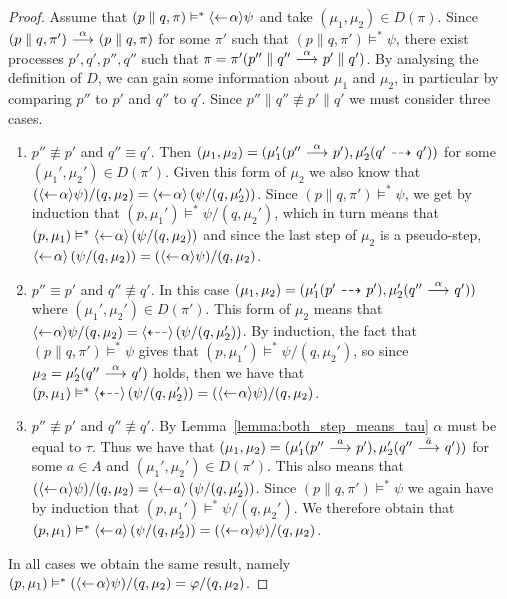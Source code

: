 \begin{proof}
    \par\nobreak
    \ltr Assume that $(p\parallel q, \pi) \vDash^* \mbox{\ensuremath{\langle\leftarrow\! \alpha \rangle}}\psi$ and take
    $(\mu_1,\mu_2)\in D(\pi)$. Since \mbox{$(p\parallel q, \pi') \ {\stackrel{{\alpha}}{\longrightarrow}}\  (p\parallel
    q, \pi)$} for some $\pi'$ such that $(p\parallel q,\pi') \vDash^* \psi$,
    there exist processes $p',q',p'',q''$ such that $\pi
    = \pi'(p''\parallel q'' \ {\stackrel{{\alpha}}{\longrightarrow}}\  p'\parallel q')$. By analysing the definition
    of $D$, we can gain some information about $\mu_1$ and $\mu_2$, in particular by
    comparing $p''$ to $p'$ and $q''$ to $q'$. Since $p''\parallel q'' \not\equiv
    p'\parallel q'$ we must consider three cases.
    \begin{enumerate}
        \item $p''\not\equiv p'$ and $q''\equiv q'$. Then $(\mu_1,\mu_2) = (\mu_1'
            (p'' \ {\stackrel{{\alpha}}{\longrightarrow}}\  p'), \mu_2'(q' \ {\stackrel{_{}}{\dashrightarrow}}\  q'))$ for some $(\mu_1',\mu_2')
            \in D(\pi')$. Given this form of $\mu_2$ we also know that $(\mbox{\ensuremath{\langle\leftarrow\! \alpha \rangle}}
            \psi) / (q,\mu_2) = \mbox{\ensuremath{\langle\leftarrow\! \alpha \rangle}} \left( \psi / (q,\mu_2') \right)$. Since
            $(p\parallel q, \pi') \vDash^* \psi$, we get by induction that $(p,\mu_1')
            \vDash^* \psi / (q,\mu_2')$, which in turn means that $(p,\mu_1)\vDash^*
            \mbox{\ensuremath{\langle\leftarrow\! \alpha \rangle}} \left(\psi / (q,\mu_2)\right)$ and since the last step of
            $\mu_2$ is a pseudo-step, $\mbox{\ensuremath{\langle\leftarrow\! \alpha \rangle}} \left(\psi / (q,\mu_2)\right)
            = (\mbox{\ensuremath{\langle\leftarrow\! \alpha \rangle}}\psi)/(q,\mu_2)$.
        \item $p''\equiv p'$ and $q''\not\equiv q'$. In this case $(\mu_1,\mu_2)
            = (\mu_1'(p'\ {\stackrel{_{}}{\dashrightarrow}}\ p'), \mu_2'(q''\ {\stackrel{{\alpha}}{\longrightarrow}}\ q'))$ where $(\mu_1',
            \mu_2') \in D(\pi')$. This form of $\mu_2$ means that $\mbox{\ensuremath{\langle\leftarrow\! \alpha \rangle}}
            \psi / (q,\mu_2) = \mbox{\ensuremath{\langle\stackrel{_{}}{\dashleftarrow}\rangle}} \left( \psi / (q,\mu_2') \right)$.
            By induction, the fact that $(p\parallel q, \pi') \vDash^* \psi$ gives
            that $(p,\mu_1') \vDash^* \psi / (q,\mu_2')$, so
            since $\mu_2 = \mu_2'(q'' \ {\stackrel{{\alpha}}{\longrightarrow}}\  q')$ holds, then we have that
            $(p,\mu_1) \vDash^*
            \mbox{\ensuremath{\langle\stackrel{_{}}{\dashleftarrow}\rangle}} \left( \psi / (q,\mu_2') \right) = (\mbox{\ensuremath{\langle\leftarrow\! \alpha \rangle}}\psi)
            / (q,\mu_2)$.
        \item $p''\not\equiv p'$ and $q''\not\equiv q'$. By Lemma~\ref{lemma:both_step_means_tau}
            $\alpha$ must be equal to $\tau$. Thus we have that $(\mu_1,\mu_2) =
            (\mu_1'(p''\ {\stackrel{{a}}{\longrightarrow}}\ p'), \mu_2'(q''\ {\stackrel{{\bar a}}{\longrightarrow}}\ q'))$ for some $a\in A$ and
            $(\mu_1',\mu_2') \in D(\pi')$. This also means that $(\mbox{\ensuremath{\langle\leftarrow\! \alpha \rangle}}\psi)
            / (q,\mu_2) = \mbox{\ensuremath{\langle\leftarrow\! a \rangle}}\left( \psi / (q,\mu_2') \right)$. Since $(p\parallel q,
            \pi') \vDash^* \psi$ we again have by induction that $(p,\mu_1')\vDash^*\psi/(q,
            \mu_2')$. We therefore obtain that $(p,\mu_1) \vDash^* \mbox{\ensuremath{\langle\leftarrow\! a \rangle}}\left(
            \psi / (q,\mu_2') \right) = (\mbox{\ensuremath{\langle\leftarrow\! \alpha \rangle}}\psi) / (q,\mu_2)$.
    \end{enumerate}
    In all cases we obtain the same result, namely $(p,\mu_1) \vDash^* (\mbox{\ensuremath{\langle\leftarrow\! \alpha \rangle}}\psi)
    / (q,\mu_2) = \varphi/(q,\mu_2)$.


\end{proof}
